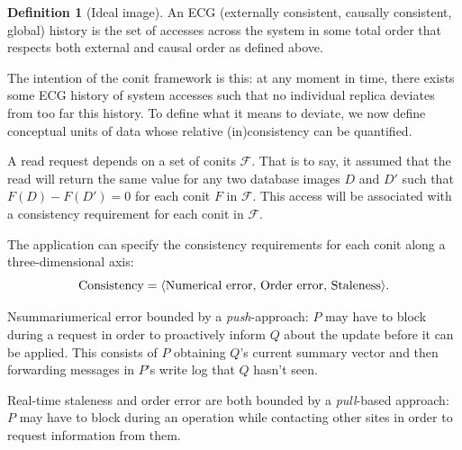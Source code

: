 \documentclass[]             %
{NASA}                       %
\theoremstyle{definition}
\newtheorem{definition}[theorem]{Definition}
\begin{document}

\begin{definition}[Ideal image]
  An ECG (externally consistent, causally consistent, global) history
  is the set of accesses across the system in some total order that
  respects both external and causal order as defined above.
\end{definition}

The intention of the conit framework is this: at any moment in time,
there exists some ECG history of system accesses such that no
individual replica deviates from too far this history. To define what
it means to deviate, we now define conceptual units of data whose
relative (in)consistency can be quantified.

A read request depends on a set of conits $\mathcal{F}$. That is to
say, it assumed that the read will return the same value for any two
database images $D$ and $D'$ such that $F(D) - F(D') = 0$ for each
conit $F$ in $\mathcal{F}$. This access will be associated with a
consistency requirement for each conit in $\mathcal{F}$.

The application can specify the consistency requirements for each
conit along a three-dimensional axis:
\[\textrm{Consistency} = \langle \textrm{Numerical error,
    \textrm{Order error}, \textrm{Staleness}} \rangle.\]

Nsummariumerical error bounded by a \emph{push}-approach: $P$ may have to
block during a request in order to proactively inform $Q$ about the
update before it can be applied. This consists of $P$ obtaining $Q$'s
current summary vector and then forwarding messages in $P$'s write log
that $Q$ hasn't seen.

Real-time staleness and order error are both bounded by a
\emph{pull}-based approach: $P$ may have to block during an operation
while contacting other sites in order to request information from
them.
\end{document}
